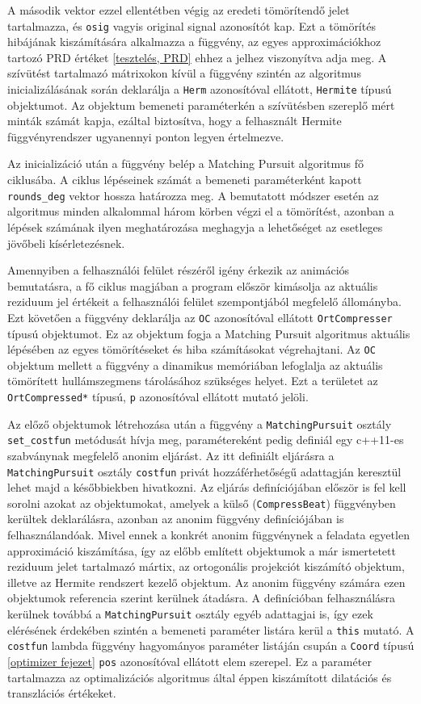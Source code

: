 \documentclass[oneside,titlepage,12pt,a4paper]{report}
\begin{document}
A második vektor ezzel ellentétben végig az eredeti tömörítendő jelet tartalmazza, és \texttt{osig} vagyis original signal azonosítót kap. Ezt
a tömörítés hibájának kiszámítására alkalmazza a függvény, az egyes approximációkhoz tartozó PRD értéket \ref{tesztelés, PRD} ehhez a jelhez
viszonyítva adja meg. A szívütést tartalmazó mátrixokon kívül a függvény szintén az algoritmus inicializálásának során deklarálja a \texttt{Herm} azonosítóval ellátott, \texttt{Hermite} típusú objektumot. Az objektum bemeneti paraméterkén a szívütésben szereplő mért minták számát kapja, ezáltal biztosítva, hogy a felhasznált Hermite függvényrendszer ugyanennyi ponton legyen értelmezve. 
\par Az inicializáció után a függvény belép a Matching Pursuit algoritmus fő ciklusába. A ciklus lépéseinek számát a bemeneti paraméterként kapott \texttt{rounds\_deg} vektor hossza határozza meg. A bemutatott módszer esetén az algoritmus minden alkalommal három körben végzi el a tömörítést, azonban a lépések számának ilyen meghatározása meghagyja a lehetőséget az esetleges jövőbeli kísérletezésnek. 
\par Amennyiben a felhasználói felület részéről igény érkezik az animációs bemutatásra, a fő ciklus magjában a program  először kimásolja az aktuális reziduum jel értékeit a felhasználói felület szempontjából megfelelő állományba. Ezt követően a függvény deklarálja az \texttt{OC} azonosítóval ellátott \texttt{OrtCompresser} típusú objektumot. Ez az objektum fogja a Matching Pursuit algoritmus aktuális lépésében az egyes tömörítéseket és hiba számításokat végrehajtani. Az \texttt{OC} objektum mellett a függvény a dinamikus memóriában lefoglalja az aktuális tömörített hullámszegmens tárolásához szükséges helyet. Ezt a területet az \texttt{OrtCompressed*} típusú, \texttt{p} azonosítóval ellátott mutató jelöli. 
\par Az előző objektumok létrehozása után a függvény a \texttt{MatchingPursuit} osztály \texttt{set\_costfun} metódusát hívja meg, paramétereként pedig definiál egy c++11-es szabványnak megfelelő anonim eljárást. Az itt definiált eljárásra a \texttt{MatchingPursuit} osztály \texttt{costfun} privát hozzáférhetőségű adattagján keresztül lehet majd a későbbiekben hivatkozni. Az eljárás definíciójában először is fel kell sorolni azokat az objektumokat, amelyek a külső (\texttt{CompressBeat}) függvényben kerültek deklarálásra, azonban az anonim függvény definíciójában is felhasználandóak. Mivel ennek a konkrét anonim függvénynek a feladata egyetlen approximáció kiszámítása, így az előbb említett objektumok a már ismertetett reziduum jelet tartalmazó mártix, az ortogonális projekciót kiszámító objektum, illetve az Hermite rendszert kezelő objektum. Az anonim függvény számára ezen objektumok referencia szerint kerülnek átadásra. A definícióban felhasználásra kerülnek továbbá a \texttt{MatchingPursuit} osztály egyéb adattagjai is, így ezek elérésének érdekében szintén a bemeneti paraméter listára kerül a \texttt{this} mutató. A \texttt{costfun} lambda függvény hagyományos paraméter listáján csupán a \texttt{Coord} típusú \ref{optimizer fejezet} \texttt{pos} azonosítóval ellátott elem szerepel. Ez a paraméter tartalmazza az optimalizációs algoritmus által éppen kiszámított dilatációs és transzlációs értékeket. 
\end{document}
